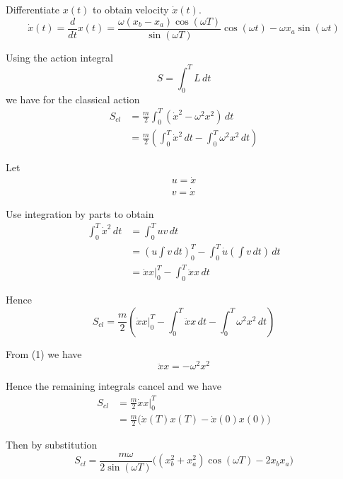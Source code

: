\documentclass[12pt]{article}
\begin{document}
Differentiate $x(t)$ to obtain velocity $\dot x(t)$.
\begin{equation*}
\dot x(t)=\frac{d}{dt}x(t)=\frac{\omega(x_b-x_a)\cos(\omega T)}{\sin(\omega T)} \cos(\omega t)-\omega x_a\sin(\omega t)
\end{equation*}

Using the action integral
\begin{equation*}
S=\int_0^T L\,dt
\end{equation*}
we have for the classical action
\begin{align*}
S_{cl}&=\frac{m}{2}\int_0^T (\dot{x}^2-\omega^2 x^2)\,dt
\\[1ex]
&=\frac{m}{2}\left(
\int_0^T\dot{x}^2\,dt
-\int_0^T\omega^2x^2\,dt\right)
\end{align*}

Let
\begin{align*}
u=\dot x
\\
v=\dot x
\end{align*}

Use integration by parts to obtain
\begin{align*}
\int_0^T \dot x^2\,dt
&=\int_0^T uv\,dt
\\
&=\left(u\int v\,dt\right)_0^T
-\int_0^T\dot u\left(\int v\,dt\right)\,dt
\\
&=\dot xx\bigg|_0^T-\int_0^T \ddot xx\,dt
\end{align*}

Hence
\begin{equation*}
S_{cl}=\frac{m}{2}\left(
\dot xx\bigg|_0^T-\int_0^T \ddot xx\,dt
-\int_0^T\omega^2x^2\,dt
\right)
\end{equation*}

From (1) we have
\begin{equation*}
\ddot xx=-\omega^2 x^2
\end{equation*}

Hence the remaining integrals cancel and we have
\begin{align*}
S_{cl}&=\frac{m}{2}\dot xx\bigg|_0^T
\\
&=\frac{m}{2}\bigg(\dot x(T)x(T)-\dot x(0)x(0)\bigg)
\end{align*}

Then by substitution
\begin{equation*}
S_{cl}=\frac{m\omega}{2\sin(\omega T)}
\bigg((x_b^2+x_a^2)\cos(\omega T)-2x_b x_a\bigg)
\end{equation*}
\end{document}
